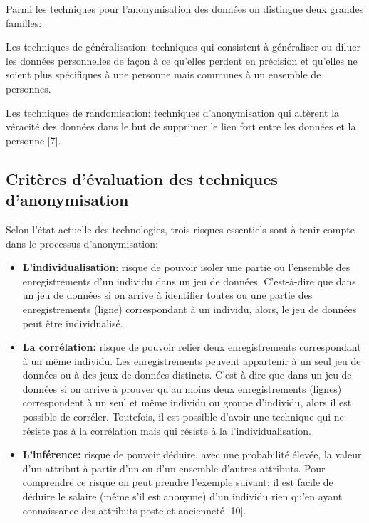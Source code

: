 Parmi les techniques pour l’anonymisation des données on distingue deux grandes familles:  

Les techniques de généralisation: techniques qui consistent à généraliser ou diluer les données personnelles de façon à ce qu’elles perdent en précision et qu’elles ne soient plus spécifiques à une personne mais communes à un ensemble de personnes. 

Les techniques de randomisation:  techniques d’anonymisation qui altèrent la véracité des données dans le but de supprimer le lien fort entre les données et la personne [7]. 

\subsection{Critères d’évaluation des techniques d’anonymisation}

Selon l’état actuelle des technologies, trois risques essentiels sont à tenir compte dans le processus d’anonymisation:  

\begin{itemize}
 
    \item \textbf{L’individualisation}: risque de pouvoir isoler une partie ou l’ensemble des enregistrements d’un individu dans un jeu de données. C’est-à-dire que dans un jeu de données si on arrive à identifier toutes ou une partie des enregistrements (ligne) correspondant à un individu, alors, le jeu de données peut être individualisé. 

    \item \textbf{La corrélation:} risque de pouvoir relier deux enregistrements correspondant à un même individu. Les enregistrements peuvent appartenir à un seul jeu de données ou à des jeux de données distincts. C’est-à-dire que dans un jeu de données si on arrive à prouver qu’au moins deux enregistrements (lignes) correspondent à un seul et même individu ou groupe d’individu, alors il est possible de corréler. Toutefois, il est possible d’avoir une technique qui ne résiste pas à la corrélation mais qui résiste à la l’individualisation.  

    \item \textbf{L’inférence:} risque de pouvoir déduire, avec une probabilité élevée, la valeur d’un attribut à partir d’un ou d’un ensemble d’autres attributs. Pour comprendre ce risque on peut prendre l’exemple suivant: il est facile de déduire le salaire (même s’il est anonyme) d’un individu rien qu’en ayant connaissance des attributs poste et ancienneté [10]. 
\end{itemize}
